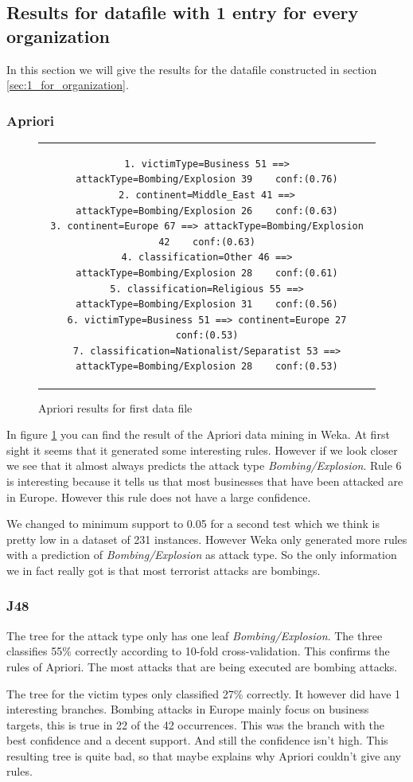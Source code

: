 \documentclass[a4]{article}
\begin{document}
\subsection{Results for datafile with 1 entry for every organization}
In this section we will give the results for the datafile constructed in section \ref{sec:1_for_organization}.
\subsubsection{Apriori}
\FloatBarrier
\begin{figure}[!h]
\centering
\begin{tabular}{c}
\begin{lstlisting}
1. victimType=Business 51 ==> attackType=Bombing/Explosion 39    conf:(0.76)
2. continent=Middle_East 41 ==> attackType=Bombing/Explosion 26    conf:(0.63)
3. continent=Europe 67 ==> attackType=Bombing/Explosion 42    conf:(0.63)
4. classification=Other 46 ==> attackType=Bombing/Explosion 28    conf:(0.61)
5. classification=Religious 55 ==> attackType=Bombing/Explosion 31    conf:(0.56)
6. victimType=Business 51 ==> continent=Europe 27    conf:(0.53)
7. classification=Nationalist/Separatist 53 ==> attackType=Bombing/Explosion 28    conf:(0.53)
\end{lstlisting}
\end{tabular}
\caption{Apriori results for first data file}
\label{fig:apriori_1}
\end{figure}
In figure \ref{fig:apriori_1} you can find the result of the Apriori data mining in Weka. At first sight it seems that it generated some interesting rules. However if we look closer we see that it almost always predicts the attack type \textit{Bombing/Explosion}. Rule 6 is interesting because it tells us that most businesses that have been attacked are in Europe. However this rule does not have a large confidence.\par
We changed to minimum support to 0.05 for a second test which we think is pretty low in a dataset of 231 instances. However Weka only generated more rules with a prediction of \textit{Bombing/Explosion} as attack type. So the only information we in fact really got is that most terrorist attacks are bombings.
\subsubsection{J48}
The tree for the attack type only has one leaf \textit{Bombing/Explosion}. The three classifies 55\% correctly according to 10-fold cross-validation. This confirms the rules of Apriori. The most attacks that are being executed are bombing attacks.\par
The tree for the victim types only classified 27\% correctly. It however did have 1 interesting branches. Bombing attacks in Europe mainly focus on business targets, this is true in 22 of the 42 occurrences. This was the branch with the best confidence and a decent support. And still the confidence isn't high. This resulting tree is quite bad, so that maybe explains why Apriori couldn't give any rules.
\end{document}
